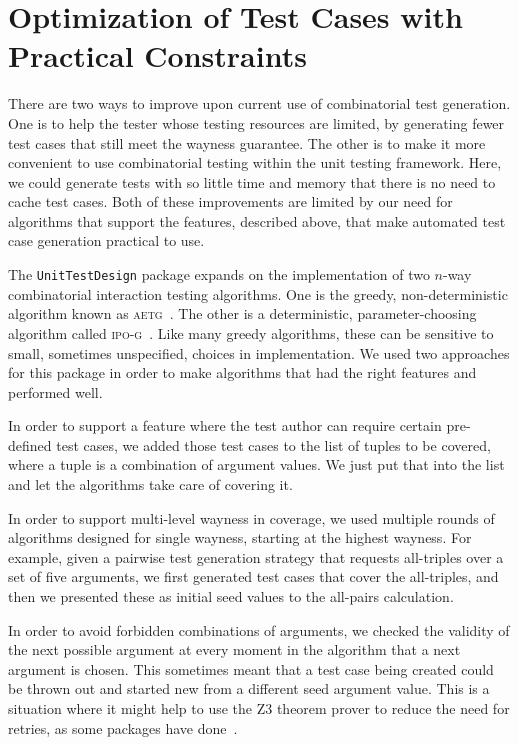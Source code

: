 \documentclass{juliacon}
\newcommand{\utd}{\texttt{UnitTestDesign}\xspace}
\begin{document}
\section{Optimization of Test Cases with Practical Constraints}\label{sec:implementation}

There are two ways to improve upon current use of combinatorial test generation. One is to help the tester whose testing resources are limited, by generating fewer test cases that still meet the wayness guarantee. The other is to make it more convenient to use combinatorial testing within the unit testing framework. Here, we could generate tests with so little time and memory that there is no need to cache test cases. Both of these improvements are limited by our need for algorithms that support the features, described above, that make automated test case generation practical to use.

\vskip 6pt
The \utd package expands on the implementation of two $n$-way combinatorial interaction testing algorithms. One is the greedy, non-deterministic algorithm known as \textsc{aetg}~\cite{Cohen1997-lb}. The other is a deterministic, parameter-choosing algorithm called \textsc{ipo-g}~\cite{Lei2008-xt}. Like many greedy algorithms, these can be sensitive to small, sometimes unspecified, choices in implementation. We used two approaches for this package in order to make algorithms that had the right features and performed well.

\vskip 6pt
In order to support a feature where the test author can require certain pre-defined test cases, we added those test cases to the list of tuples to be covered, where a tuple is a combination of argument values. We just put that into the list and let the algorithms take care of covering it.

\vskip 6pt
In order to support multi-level wayness in coverage, we used multiple rounds of algorithms designed for single wayness, starting at the highest wayness. For example, given a pairwise test generation strategy that requests all-triples over a set of five arguments, we first generated test cases that cover the all-triples, and then we presented these as initial seed values to the all-pairs calculation.

\vskip 6pt
In order to avoid forbidden combinations of arguments, we checked the validity of the next possible argument at every moment in the algorithm that a next argument is chosen. This sometimes meant that a test case being created could be thrown out and started new from a different seed argument value. This is a situation where it might help to use the Z3 theorem prover to reduce the need for retries, as some packages have done~\cite{Nie2011-yl}.
\end{document}
